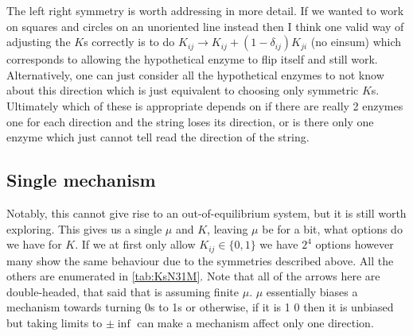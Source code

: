 \documentclass[11pt]{article}
\begin{document}
The left right symmetry is worth addressing in more detail.
If we wanted to work on squares and circles on an unoriented line instead then I think one valid way of adjusting the $K$s correctly is to do $K_{ij} \rightarrow K_{ij} + (1-\delta_{ij})K_{ji}$ (no einsum) which corresponds to allowing the hypothetical enzyme to flip itself and still work.
Alternatively, one can just consider all the hypothetical enzymes to not know about this direction which is just equivalent to choosing only symmetric $K$s.
Ultimately which of these is appropriate depends on if there are really 2 enzymes one for each direction and the string loses its direction, or is there only one enzyme which just cannot tell read the direction of the string.


\subsection{Single mechanism}
Notably, this cannot give rise to an out-of-equilibrium system, but it is still worth exploring.
This gives us a single $\mu$ and $K$, leaving $\mu$ be for a bit, what options do we have for $K$.
If we at first only allow $K_{ij}\in\{0,1\}$ we have $2^4$ options however many show the same behaviour due to the symmetries described above.
All the others are enumerated in \cref{tab:KsN31M}.
Note that all of the arrows here are double-headed, that said that is assuming finite $\mu$.
$\mu$ essentially biases a mechanism towards turning 0s to 1s or otherwise, if it is 1 0 then it is unbiased but taking limits to $\pm \inf$ can make a mechanism affect only one direction.
\end{document}
